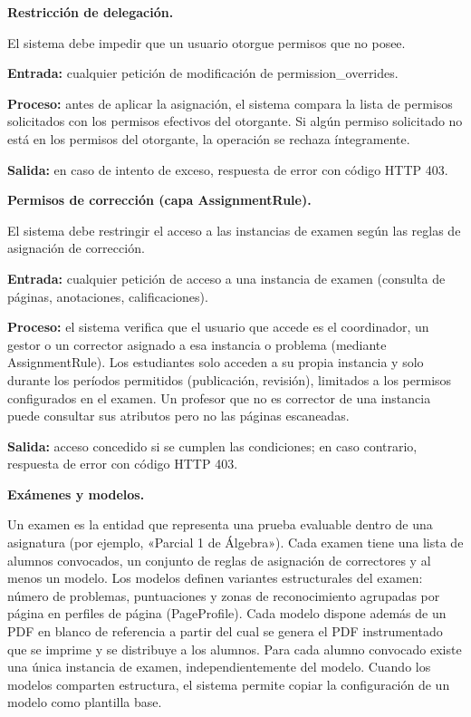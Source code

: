 \begin{functional}
\begin{functional}
    \item \textbf{Restricción de delegación.}

    El sistema debe impedir que un usuario otorgue permisos que no posee.

    \textbf{Entrada:} cualquier petición de modificación de permission\_overrides.

    \textbf{Proceso:} antes de aplicar la asignación, el sistema compara la lista de permisos solicitados con los permisos efectivos del otorgante. Si algún permiso solicitado no está en los permisos del otorgante, la operación se rechaza íntegramente.

    \textbf{Salida:} en caso de intento de exceso, respuesta de error con código HTTP 403.

    \item \textbf{Permisos de corrección (capa AssignmentRule).}

    El sistema debe restringir el acceso a las instancias de examen según las reglas de asignación de corrección.

    \textbf{Entrada:} cualquier petición de acceso a una instancia de examen (consulta de páginas, anotaciones, calificaciones).

    \textbf{Proceso:} el sistema verifica que el usuario que accede es el coordinador, un gestor o un corrector asignado a esa instancia o problema (mediante AssignmentRule). Los estudiantes solo acceden a su propia instancia y solo durante los períodos permitidos (publicación, revisión), limitados a los permisos configurados en el examen. Un profesor que no es corrector de una instancia puede consultar sus atributos pero no las páginas escaneadas.

    \textbf{Salida:} acceso concedido si se cumplen las condiciones; en caso contrario, respuesta de error con código HTTP 403.

  \end{functional}

  \item \textbf{Exámenes y modelos.}

  Un examen es la entidad que representa una prueba evaluable dentro de una asignatura (por ejemplo, «Parcial 1 de Álgebra»). Cada examen tiene una lista de alumnos convocados, un conjunto de reglas de asignación de correctores y al menos un modelo. Los modelos definen variantes estructurales del examen: número de problemas, puntuaciones y zonas de reconocimiento agrupadas por página en perfiles de página (PageProfile). Cada modelo dispone además de un PDF en blanco de referencia a partir del cual se genera el PDF instrumentado que se imprime y se distribuye a los alumnos. Para cada alumno convocado existe una única instancia de examen, independientemente del modelo. Cuando los modelos comparten estructura, el sistema permite copiar la configuración de un modelo como plantilla base.


\end{functional}
